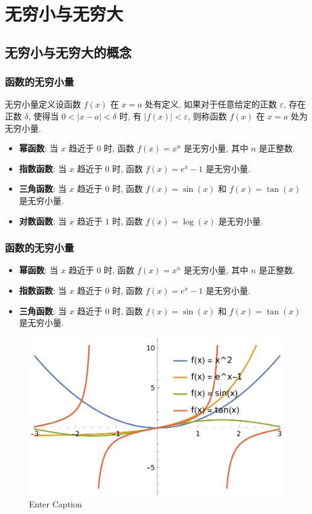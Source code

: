 \documentclass[
10pt, 
aspectratio=43, 
]{beamer}
\begin{document}
\section{无穷小与无穷大}

\subsection{无穷小与无穷大的概念}

\begin{frame}
\frametitle{函数的无穷小量}


\begin{block}{无穷小量定义}设函数 $f(x)$ 在 $x=a$ 处有定义, 如果对于任意给定的正数 $\varepsilon$, 存在正数 $\delta$, 使得当 $0 < |x-a| < \delta$ 时, 有 $|f(x)| < \varepsilon$, 则称函数 $f(x)$ 在 $x=a$ 处为无穷小量. 
\end{block}
\begin{itemize}
\item<2-> \textbf{幂函数}: 当 $x$ 趋近于 $0$ 时, 函数 $f(x) = x^n$ 是无穷小量, 其中 $n$ 是正整数. \\
\item<3-> \textbf{指数函数}: 当 $x$ 趋近于 $0$ 时, 函数 $f(x) = e^x - 1$ 是无穷小量. \\
\item<4-> \textbf{三角函数}: 当 $x$ 趋近于 $0$ 时, 函数 $f(x) = \sin(x)$ 和 $f(x) = \tan(x)$ 是无穷小量. \\
\item<5-> \textbf{对数函数}: 当 $x$ 趋近于 $1$ 时, 函数 $f(x) = \log(x)$ 是无穷小量. 
\end{itemize}

\end{frame}

\begin{frame}
\frametitle{函数的无穷小量}

\begin{itemize}
\item<2-> \textbf{幂函数}: 当 $x$ 趋近于 $0$ 时, 函数 $f(x) = x^n$ 是无穷小量, 其中 $n$ 是正整数. \\
\item<3-> \textbf{指数函数}: 当 $x$ 趋近于 $0$ 时, 函数 $f(x) = e^x - 1$ 是无穷小量. \\
\item<4-> \textbf{三角函数}: 当 $x$ 趋近于 $0$ 时, 函数 $f(x) = \sin(x)$ 和 $f(x) = \tan(x)$ 是无穷小量. 
\end{itemize}
\begin{figure}
    \centering
    \includegraphics[width=0.5\linewidth]{small1.png}
    \caption{Enter Caption}
    \label{fig: enter-label}
\end{figure}
\end{frame}
\end{document}
